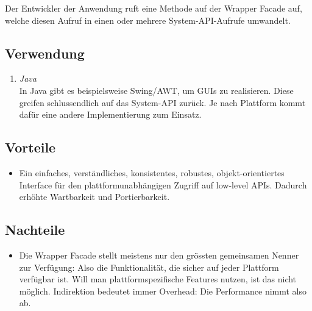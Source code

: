 Der Entwickler der Anwendung ruft eine Methode auf der Wrapper Facade auf, welche diesen Aufruf in einen oder mehrere System-API-Aufrufe umwandelt.


\subsection{Verwendung}

\begin{enumerate}
	\item \emph{Java}\\
	In Java gibt es beispielsweise Swing/AWT, um GUIs zu realisieren. Diese greifen schlussendlich auf das System-API zurück. Je nach Plattform kommt dafür eine andere Implementierung zum Einsatz.
\end{enumerate}


\subsection{Vorteile}

\begin{itemize}
	\item Ein einfaches, verständliches, konsistentes, robustes, objekt-orientiertes Interface für den plattformunabhängigen Zugriff auf low-level APIs. Dadurch erhöhte Wartbarkeit und Portierbarkeit.
\end{itemize}


\subsection{Nachteile}

\begin{itemize}
	\item Die Wrapper Facade stellt meistens nur den grössten gemeinsamen Nenner zur Verfügung: Also die Funktionalität, die sicher auf jeder Plattform verfügbar ist. Will man plattformspezifische Features nutzen, ist das nicht möglich. Indirektion bedeutet immer Overhead: Die Performance nimmt also ab.
\end{itemize}